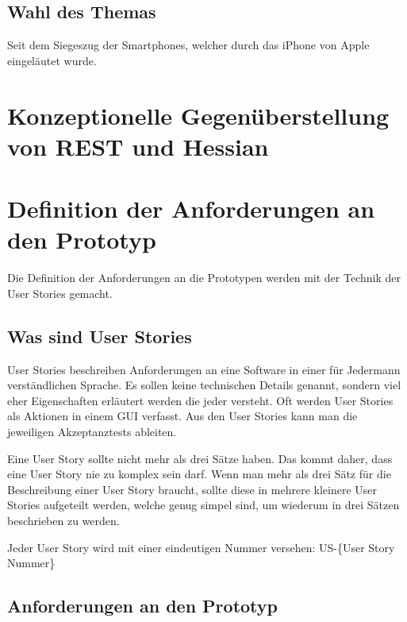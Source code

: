 \documentclass[listof=totocnumbered, bibliography=totocnumbered]{scrreprt}
\begin{document}
  \subsection{Wahl des Themas}
  
  Seit dem Siegeszug der Smartphones, welcher durch das iPhone von Apple
  eingeläutet wurde. 
  
  \newpage
  
  \section{Konzeptionelle Gegenüberstellung von REST und Hessian}
  
  
  \newpage
  
  \section{Definition der Anforderungen an den Prototyp}
  
  Die Definition der Anforderungen an die Prototypen werden mit der Technik der
  User Sto\-ries\cite{UserStories} gemacht.
  
  \subsection{Was sind User Stories}
  
  User Stories beschreiben Anforderungen an eine Software in einer für Jedermann
  verständlichen Sprache. Es sollen keine technischen Details genannt, sondern
  viel eher Eigenschaften erläutert werden die jeder versteht. Oft werden User
  Stories als Aktionen in einem \ac{GUI} verfasst. Aus den User Stories kann
  man die jeweiligen Akzeptanztests\cite{AcceptanceTests} ableiten.
  
  Eine User Story sollte nicht mehr als drei Sätze haben. Das kommt daher, dass
  eine User Story nie zu komplex sein darf. Wenn man mehr als drei Sätz für die
  Beschreibung einer User Story braucht, sollte diese in mehrere kleinere User
  Stories aufgeteilt werden, welche genug simpel sind, um wiederum in drei
  Sätzen beschrieben zu werden.
  
  Jeder User Story wird mit einer eindeutigen Nummer versehen: US-\{User Story
  Nummer\}
  
  \subsection{Anforderungen an den Prototyp}
  
\end{document}
